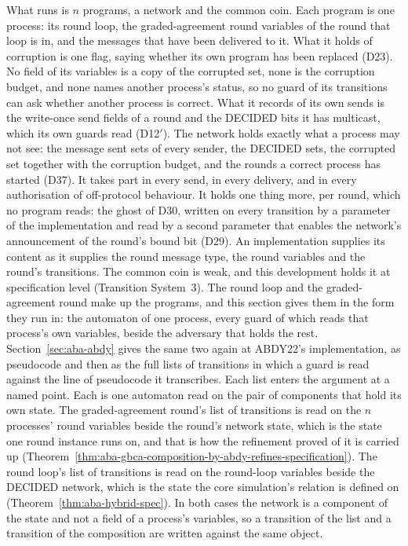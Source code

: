 What runs is $n$ programs, a network and the common coin.
Each program is one process: its round loop, the graded-agreement round variables
of the round that loop is in, and the messages that have been delivered to it.
What it holds of corruption is one flag, saying whether its own program has been
replaced (D23).
No field of its variables is a copy of the corrupted set, none is the corruption
budget, and none names another process's status, so no guard of its transitions can
ask whether another process is correct.
What it records of its own sends is the write-once send fields of a round and the
DECIDED bits it has multicast, which its own guards read (D12$'$).
The network holds exactly what a process may not see: the message
sent sets of every sender, the DECIDED sets, the corrupted set together with
the corruption budget, and the rounds a correct process has started (D37).
It takes part in every send, in every delivery, and in every authorisation of
off-protocol behaviour.
It holds one thing more, per round, which no program reads: the ghost of
D30, written on every transition by a parameter of the implementation and read by a second
parameter that enables the network's announcement of the round's bound bit (D29).
An implementation supplies its content as it supplies the round message type, the
round variables and the round's transitions.
The common coin is weak, and this development holds it at
specification level (Transition System~3).
The round loop and the graded-agreement round make up the programs, and this
section gives them in the form they run in: the automaton of one process, every
guard of which reads that process's own variables, beside the adversary that holds
the rest.
Section~\ref{sec:aba-abdy} gives the same two again at ABDY22's implementation, as
pseudocode and then as the full lists of transitions in which a guard is read against the
line of pseudocode it transcribes.
Each list enters the argument at a named point.
Each is one automaton read on the pair of components that hold its own state.
The graded-agreement round's list of transitions is read on the $n$ processes' round variables beside the
round's network state, which is the state one round instance runs on, and
that is how the refinement proved of it is carried up
(Theorem~\ref{thm:aba-gbca-composition-by-abdy-refines-specification}).
The round loop's list of transitions is read on the round-loop variables beside the DECIDED
network, which is the state the core simulation's relation is defined on
(Theorem~\ref{thm:aba-hybrid-spec}).
In both cases the network is a component of the state and not a field of a process's variables,
so a transition of the list and a transition of the composition are written against the
same object.


